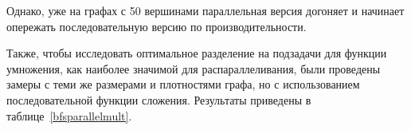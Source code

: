 Однако, уже на графах с 50 вершинами параллельная версия догоняет и начинает опережать последовательную версию по производительности.

\begin{table}[h]
\centering
    \caption{Сравнение производительности параллельного и обычного Bfs на графах с 50 вершинами. Графа \texttt{SpeedUp} показывает отношение скорости работы параллельной версии алгоритма к скорости работы последовательной версии.}
    \label{bfscomparison}
\end{table}

Также, чтобы исследовать оптимальное разделение на подзадачи для функции умножения, как наиболее значимой для распараллеливания, были проведены замеры с теми же размерами и плотностями графа, но с использованием последовательной функции сложения. Результаты приведены в таблице~\ref{bfsparallelmult}.


